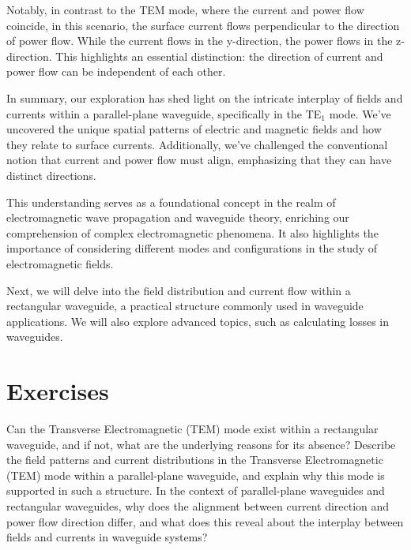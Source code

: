 Notably, in contrast to the TEM mode, where the current and power flow coincide, in this scenario, the surface current flows perpendicular to the direction of power flow. While the current flows in the y-direction, the power flows in the z-direction. This highlights an essential distinction: the direction of current and power flow can be independent of each other.

In summary, our exploration has shed light on the intricate interplay of fields and currents within a parallel-plane waveguide, specifically in the TE$_1$ mode. We've uncovered the unique spatial patterns of electric and magnetic fields and how they relate to surface currents. Additionally, we've challenged the conventional notion that current and power flow must align, emphasizing that they can have distinct directions.

This understanding serves as a foundational concept in the realm of electromagnetic wave propagation and waveguide theory, enriching our comprehension of complex electromagnetic phenomena. It also highlights the importance of considering different modes and configurations in the study of electromagnetic fields.

Next, we will delve into the field distribution and current flow within a rectangular waveguide, a practical structure commonly used in waveguide applications. We will also explore advanced topics, such as calculating losses in waveguides.

\section*{Exercises}
\begin{ExerciseList}
\Exercise[label={ex401}]
Can the Transverse Electromagnetic (TEM) mode exist within a rectangular waveguide, and if not, what are the underlying reasons for its absence?
\Exercise[label={ex402}]
Describe the field patterns and current distributions in the Transverse Electromagnetic (TEM) mode within a parallel-plane waveguide, and explain why this mode is supported in such a structure.
\Exercise[label={ex403}]
In the context of parallel-plane waveguides and rectangular waveguides, why does the alignment between current direction and power flow direction differ, and what does this reveal about the interplay between fields and currents in waveguide systems?
\end{ExerciseList}
